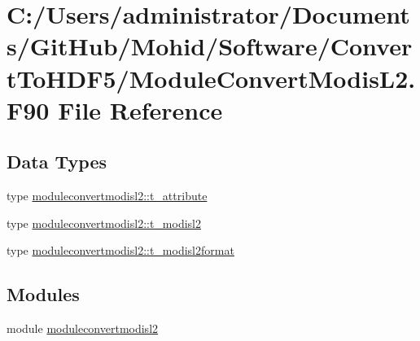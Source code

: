 \hypertarget{_module_convert_modis_l2_8_f90}{}\section{C\+:/\+Users/administrator/\+Documents/\+Git\+Hub/\+Mohid/\+Software/\+Convert\+To\+H\+D\+F5/\+Module\+Convert\+Modis\+L2.F90 File Reference}
\label{_module_convert_modis_l2_8_f90}
\subsection*{Data Types}
\begin{DoxyCompactItemize}
\item 
type \mbox{\hyperlink{structmoduleconvertmodisl2_1_1t__attribute}{moduleconvertmodisl2\+::t\+\_\+attribute}}
\item 
type \mbox{\hyperlink{structmoduleconvertmodisl2_1_1t__modisl2}{moduleconvertmodisl2\+::t\+\_\+modisl2}}
\item 
type \mbox{\hyperlink{structmoduleconvertmodisl2_1_1t__modisl2format}{moduleconvertmodisl2\+::t\+\_\+modisl2format}}
\end{DoxyCompactItemize}
\subsection*{Modules}
\begin{DoxyCompactItemize}
\item 
module \mbox{\hyperlink{namespacemoduleconvertmodisl2}{moduleconvertmodisl2}}
\end{DoxyCompactItemize}
